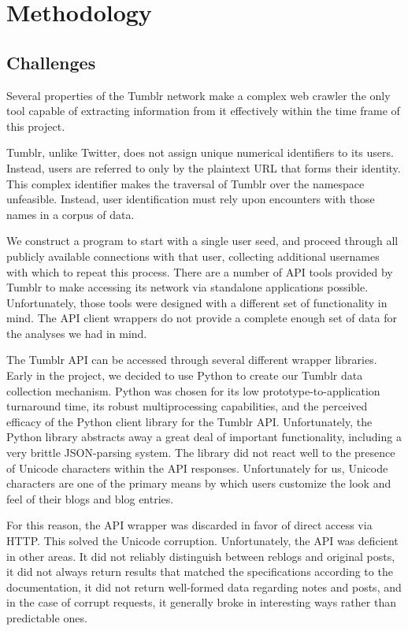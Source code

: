 \section{Methodology}
\label{sec:-method}

\subsection{Challenges}
Several properties of the Tumblr network make a complex web crawler the 
only tool capable of extracting information from it effectively within 
the time frame of this project.  

Tumblr, unlike Twitter, does not assign unique numerical identifiers 
to its users.  Instead, users are referred to only by the plaintext URL 
that forms their identity.  This complex identifier makes the traversal 
of Tumblr over the namespace unfeasible.  Instead, user identification 
must rely upon encounters with those names in a corpus of data.

We construct a program to start with a single user seed, and proceed 
through all publicly available connections with that user, collecting 
additional usernames with which to repeat this process.  There are a 
number of API tools provided by Tumblr to make accessing its network 
via standalone applications possible.  Unfortunately, those tools were 
designed with a different set of functionality in mind.  The API 
client wrappers do not provide a complete enough set of data for the 
analyses we had in mind.

The Tumblr API can be accessed through several different wrapper 
libraries.  Early in the project, we decided to use Python to create 
our Tumblr data collection mechanism.  Python was chosen for its 
low prototype-to-application turnaround time, its robust 
multiprocessing capabilities, and the perceived efficacy of the 
Python client library for the Tumblr API.  Unfortunately, the Python 
library abstracts away a great deal of important functionality, 
including a very brittle JSON-parsing system.  The library did not 
react well to the presence of Unicode characters within the API 
responses.  Unfortunately for us, Unicode characters are one of the primary 
means by which users customize the look and feel of their blogs and 
blog entries.

For this reason, the API wrapper was discarded in favor of direct 
access via HTTP.  This solved the Unicode corruption.  Unfortunately, 
the API was deficient in other areas.  It did not reliably distinguish 
between reblogs and original posts, it did not always return results 
that matched the specifications according to the documentation, it did 
not return well-formed data regarding notes and posts, and in the case 
of corrupt requests, it generally broke in interesting ways rather 
than predictable ones.


